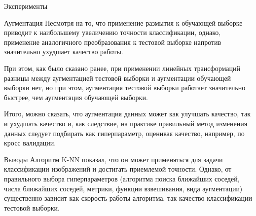 \documentclass[a4paper,12pt,titlepage,finall]{article}
\begin{document}
\begin{section}{Эксперименты}
\begin{subsection}{Аугментация}
Несмотря на то, что применение размытия к обучающей выборке приводит к наибольшему увеличению точности классификации, однако, применение аналогичного преобразования к тестовой выборке напротив значительно ухудшает качество работы.\par

При этом, как было сказано ранее, при применении линейных трансформаций разницы между аугментацией тестовой выборки и аугментации обучающей выборки нет, но при этом, аугментация тестовой выборки работает значительно быстрее, чем аугментация обучающей выборки.\par

Итого, можно сказать, что аугментация данных может как улучшать качество, так и ухудшать качество и, как следствие, на практике правильный метод изменения данных следует подбирать как гиперпараметр, оценивая качество, например, по кросс валидации.

\end{subsection}
	
\end{section}

\begin{section}{Выводы}
	Алгоритм K-NN показал, что он может применяться для задачи классификации изображений и достигать приемлемой точности. Однако, от правильного выбора гиперпараметров (алгоритма поиска ближайших соседей, числа ближайших соседей, метрики, функции взвешивания, вида аугментации) существенно зависит как скорость работы алгоритма, так качество классификации тестовой выборки.
\end{section}

\newpage

\begin{thebibliography}{9}
	 
\end{thebibliography}
\end{document}

